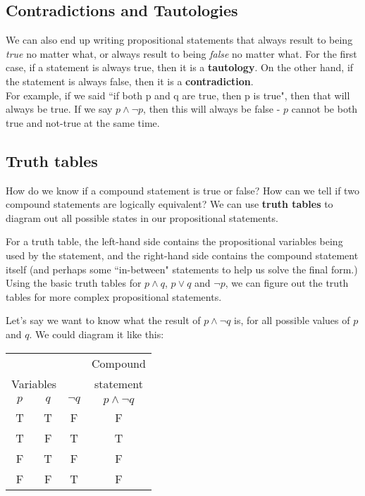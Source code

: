 \documentclass[../RachelNotes.tex]{subfiles}
\begin{document}
    \subsection{Contradictions and Tautologies}

        We can also end up writing propositional statements that always
        result to being \textit{true} no matter what, or always
        result to being \textit{false} no matter what. For the first case,
        if a statement is always true, then it is a \textbf{tautology}.
        On the other hand, if the statement is always false, then
        it is a \textbf{contradiction}. ~\\
        
        For example, if we said ``if both p and q are true, then p is true",
        then that will always be true. If we say $p \land \neg p$, then
        this will always be false - $p$ cannot be both true and not-true
        at the same time.


    \subsection{Truth tables}

        
        How do we know if a compound statement is true or false?
        How can we tell if two compound statements are logically equivalent?
        We can use \textbf{truth tables} to diagram out all possible states
        in our propositional statements.

        For a truth table, the left-hand side contains the propositional
        variables being used by the statement, and the right-hand side
        contains the compound statement itself (and perhaps some ``in-between"
        statements to help us solve the final form.)
        Using the basic truth tables for $p \land q$, $p \lor q$ and $\neg p$,
        we can figure out the truth tables for more complex propositional statements.

        \newpage
        
        
        Let's say we want to know what the result of $p \land \neg q$ is,
        for all possible values of $p$ and $q$. We could diagram it like this:
        
        \begin{center}
            \begin{tabular}{c c | c | c}
                & & & Compound
                \\
                \multicolumn{2}{c|}{Variables} & & statement
                \\
                $p$ & $q$ & $\neg q$ & $p \land \neg q$
                \\ \hline
                T & T & F & F
                \\
                T & F & T & T
                \\
                F & T & F & F
                \\
                F & F & T & F
            \end{tabular}
        \end{center}
\end{document}
